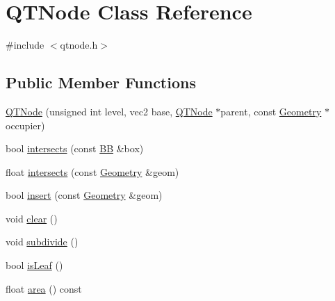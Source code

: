\hypertarget{class_q_t_node}{\section{Q\+T\+Node Class Reference}
\label{class_q_t_node}
}


{\ttfamily \#include $<$qtnode.\+h$>$}

\subsection*{Public Member Functions}
\begin{DoxyCompactItemize}
\item 
\hyperlink{class_q_t_node_a9052ae467de820a39e60ceea901773ad}{Q\+T\+Node} (unsigned int level, vec2 base, \hyperlink{class_q_t_node}{Q\+T\+Node} $\ast$parent, const \hyperlink{class_geometry}{Geometry} $\ast$occupier)
\item 
bool \hyperlink{class_q_t_node_ae53c16153e6a475951631b11d44255fe}{intersects} (const \hyperlink{class_b_b}{B\+B} \&box)
\item 
float \hyperlink{class_q_t_node_ac41137dbf5e7ce94fcd73687f8f286b9}{intersects} (const \hyperlink{class_geometry}{Geometry} \&geom)
\item 
bool \hyperlink{class_q_t_node_a202f7f3dea37652fa789dd2d1e3936ff}{insert} (const \hyperlink{class_geometry}{Geometry} \&geom)
\item 
void \hyperlink{class_q_t_node_ab570871d686ec0259441ae53969214cb}{clear} ()
\item 
void \hyperlink{class_q_t_node_aa2407622dcf020ec462853f0733c5ecc}{subdivide} ()
\item 
bool \hyperlink{class_q_t_node_a88da0613a83f215265eed249c9b46559}{is\+Leaf} ()
\item 
float \hyperlink{class_q_t_node_a2e22bf4a02893452199b73ef0c22f016}{area} () const 
\end{DoxyCompactItemize}
